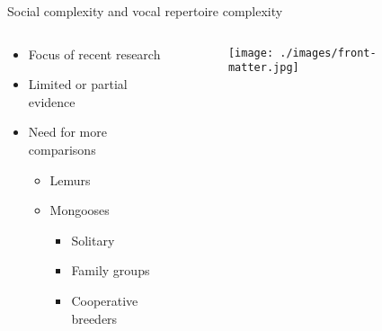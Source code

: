 \documentclass[xcolor=dvipsnames]{beamer}
\begin{document}
\begin{frame}{Social complexity and vocal repertoire complexity}
\begin{overlayarea}{\textwidth}{1\paperheight}
\begin{columns}
\begin{column}{.5\textwidth}
\begin{itemize}
\item<1-> Focus of recent research 
\item<2-> Limited or partial evidence
\item<3-> Need for more comparisons
\begin{itemize}
\item<4-> Lemurs
\item<4-> Mongooses 
\begin{itemize}
\item<5-> Solitary
\item<5-> Family groups
\item<5-> Cooperative breeders
\end{itemize}
\end{itemize}
\end{itemize}
		\end{column}
		\begin{column}{.5\textwidth}
\begin{figure}[b]
\texttt{[image: ./images/front-matter.jpg]}
\end{figure}
\end{column}
\end{columns}
\end{overlayarea}
\end{frame}
\end{document}
